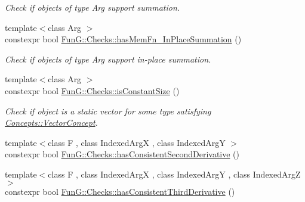 \begin{DoxyCompactItemize}
\begin{DoxyCompactList}\small\item\em Check if objects of type Arg support summation. \end{DoxyCompactList}\item 
{\footnotesize template$<$class Arg $>$ }\\constexpr bool \hyperlink{group__Checks_ga5357edca3d0fdcfbc1fba5fd43713b40}{Fun\+G\+::\+Checks\+::has\+Mem\+Fn\+\_\+\+In\+Place\+Summation} ()
\begin{DoxyCompactList}\small\item\em Check if objects of type Arg support in-\/place summation. \end{DoxyCompactList}\item 
{\footnotesize template$<$class Arg $>$ }\\constexpr bool \hyperlink{group__Checks_gadcc3e179af2ed0384a3773ea086045b9}{Fun\+G\+::\+Checks\+::is\+Constant\+Size} ()
\begin{DoxyCompactList}\small\item\em Check if object is a static vector for some type satisfying \hyperlink{structFunG_1_1Concepts_1_1VectorConcept}{Concepts\+::\+Vector\+Concept}. \end{DoxyCompactList}\item 
{\footnotesize template$<$class F , class Indexed\+Arg\+X , class Indexed\+Arg\+Y $>$ }\\constexpr bool \hyperlink{group__Checks_ga072e2c21fa90be998a34975fb2975772}{Fun\+G\+::\+Checks\+::has\+Consistent\+Second\+Derivative} ()
\item 
{\footnotesize template$<$class F , class Indexed\+Arg\+X , class Indexed\+Arg\+Y , class Indexed\+Arg\+Z $>$ }\\constexpr bool \hyperlink{group__Checks_gaad092e45db1d0c1d7b6f69a5562679fa}{Fun\+G\+::\+Checks\+::has\+Consistent\+Third\+Derivative} ()
\end{DoxyCompactItemize}
